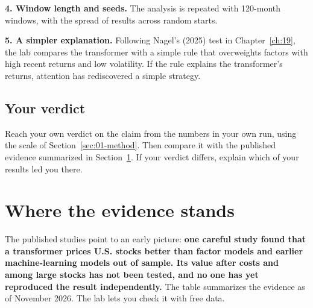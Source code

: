 \textbf{4. Window length and seeds.} The analysis is repeated with 120-month windows, with the spread of results across random starts.

\textbf{5. A simpler explanation.} Following Nagel's (2025) test in Chapter~\ref{ch:19}, the lab compares the transformer with a simple rule that overweights factors with high recent returns and low volatility. If the rule explains the transformer's returns, attention has rediscovered a simple strategy.

\subsection*{Your verdict}

Reach your own verdict on the claim from the numbers in your own run, using the scale of Section~\ref{sec:01-method}. Then compare it with the published evidence summarized in Section~\ref{sec:22-verdict}. If your verdict differs, explain which of your results led you there.

\section{Where the evidence stands}
\label{sec:22-verdict}

The published studies point to an early picture: \textbf{one careful study found that a transformer prices U.S. stocks better than factor models and earlier machine-learning models out of sample. Its value after costs and among large stocks has not been tested, and no one has yet reproduced the result independently.} The table summarizes the evidence as of November 2026. The lab lets you check it with free data.

